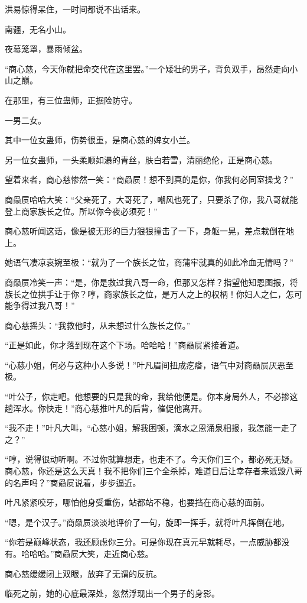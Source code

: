 \begin{this_body}
洪易惊得呆住，一时间都说不出话来。

南疆，无名小山。

夜幕笼罩，暴雨倾盆。

“商心慈，今天你就把命交代在这里罢。”一个矮壮的男子，背负双手，昂然走向小山之巅。

在那里，有三位蛊师，正据险防守。

一男二女。

其中一位女蛊师，伤势很重，是商心慈的婢女小兰。

另一位女蛊师，一头柔顺如瀑的青丝，肤白若雪，清丽绝伦，正是商心慈。

望着来者，商心慈惨然一笑：“商赑屃！想不到真的是你，你我何必同室操戈？”

商赑屃哈哈大笑：“父亲死了，大哥死了，嘲风也死了，只要杀了你，我八哥就能登上商家族长之位。所以你今夜必须死！”

商心慈听闻这话，像是被无形的巨力狠狠撞击了一下，身躯一晃，差点栽倒在地上。

她语气凄凉哀婉至极：“就为了一个族长之位，商蒲牢就真的如此冷血无情吗？”

商赑屃冷笑一声：“是，你是救过我八哥一命，但那又怎样？指望他知恩图报，将族长之位拱手让于你？哼，商家族长之位，是万人之上的权柄！你妇人之仁，怎可能争得过我八哥！”

商心慈摇头：“我救他时，从未想过什么族长之位。”

“正是如此，你才落到现在这个下场。哈哈哈！”商赑屃紧接着道。

“心慈小姐，何必与这种小人多说！”叶凡眉间扭成疙瘩，语气中对商赑屃厌恶至极。

“叶公子，你走吧。他想要的只是我的命，我给他便是。你本身局外人，不必掺这趟浑水。你快走！”商心慈推叶凡的后背，催促他离开。

“我不走！”叶凡大叫，“心慈小姐，解我困顿，滴水之恩涌泉相报，我怎能一走了之？”

“哼，说得很动听啊。不过你就算想走，也走不了。今天你们三个，都必死无疑。商心慈，你还是这么天真！我不把你们三个全杀掉，难道日后让幸存者来诋毁八哥的名声吗？”商赑屃说着，步步逼近。

叶凡紧紧咬牙，哪怕他身受重伤，站都站不稳，也要挡在商心慈的面前。

“嗯，是个汉子。”商赑屃淡淡地评价了一句，旋即一挥手，就将叶凡挥倒在地。

“你若是巅峰状态，我还顾虑你三分。可是你现在真元早就耗尽，一点威胁都没有。哈哈哈。”商赑屃大笑，走近商心慈。

商心慈缓缓闭上双眼，放弃了无谓的反抗。

临死之前，她的心底最深处，忽然浮现出一个男子的身影。


\end{this_body}
